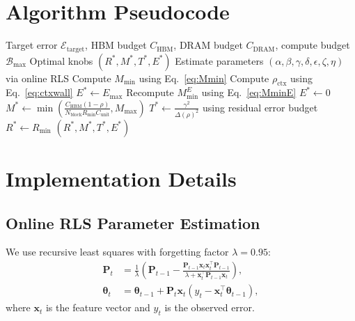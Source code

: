 \documentclass[11pt,a4paper]{article}
\theoremstyle{plain}
\theoremstyle{definition}
\begin{document}
\section{Algorithm Pseudocode}
\label{app:algorithms}

\begin{algorithm}[h]
\caption{MATDO-E Resource Scheduler}
\label{alg:scheduler}
\begin{algorithmic}[1]
\Require Target error $\mathcal{E}_{\text{target}}$, HBM budget $C_{\text{HBM}}$, DRAM budget $C_{\text{DRAM}}$, compute budget $\mathcal{B}_{\max}$
\Ensure Optimal knobs $(R^*, M^*, T^*, E^*)$
\State Estimate parameters $(\alpha, \beta, \gamma, \delta, \epsilon, \zeta, \eta)$ via online RLS
\State Compute $M_{\min}$ using Eq.~\eqref{eq:Mmin}
\State Compute $\rho_{\text{ctx}}$ using Eq.~\eqref{eq:ctxwall}
    \State $E^* \gets E_{\max}$
    \State Recompute $M_{\min}^E$ using Eq.~\eqref{eq:MminE}
\Else
    \State $E^* \gets 0$
\EndIf
\State $M^* \gets \min\left(\frac{C_{\text{HBM}}(1-\rho)}{N_{\text{block}} R_{\min} C_{\text{unit}}}, M_{\max}\right)$
\State $T^* \gets \frac{\gamma^2}{\Delta(\rho)^2}$ using residual error budget
\State $R^* \gets R_{\min}$ 
\State \Return $(R^*, M^*, T^*, E^*)$
\end{algorithmic}
\end{algorithm}

\section{Implementation Details}
\label{app:implementation}

\subsection{Online RLS Parameter Estimation}
We use recursive least squares with forgetting factor $\lambda = 0.95$:
\begin{align*}
\mathbf{P}_{t} &= \frac{1}{\lambda}\left(\mathbf{P}_{t-1} - \frac{\mathbf{P}_{t-1}\mathbf{x}_t\mathbf{x}_t^\top\mathbf{P}_{t-1}}{\lambda + \mathbf{x}_t^\top\mathbf{P}_{t-1}\mathbf{x}_t}\right), \\
\boldsymbol{\theta}_{t} &= \boldsymbol{\theta}_{t-1} + \mathbf{P}_{t}\mathbf{x}_t(y_t - \mathbf{x}_t^\top\boldsymbol{\theta}_{t-1}),
\end{align*}
where $\mathbf{x}_t$ is the feature vector and $y_t$ is the observed error.
\end{document}
